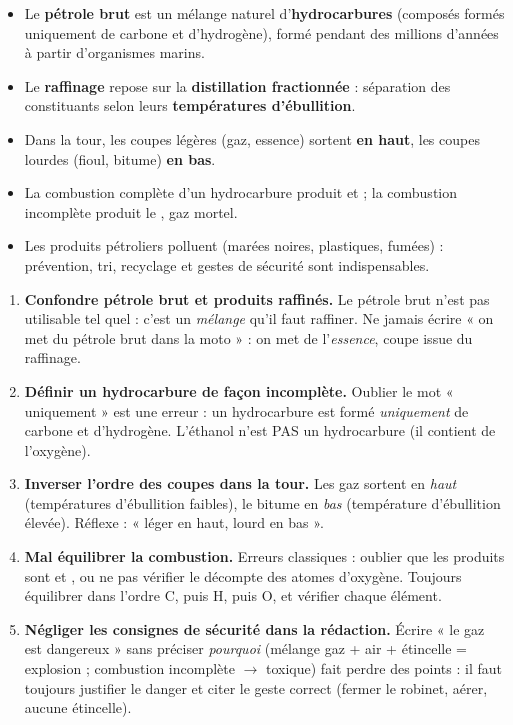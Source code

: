 \documentclass[11pt]{article}
\begin{document}
\begin{aretenir}
\begin{itemize}
\item Le \textbf{pétrole brut} est un mélange naturel d'\textbf{hydrocarbures} (composés formés uniquement de carbone et d'hydrogène), formé pendant des millions d'années à partir d'organismes marins.
\item Le \textbf{raffinage} repose sur la \textbf{distillation fractionnée} : séparation des constituants selon leurs \textbf{températures d'ébullition}.
\item Dans la tour, les coupes légères (gaz, essence) sortent \textbf{en haut}, les coupes lourdes (fioul, bitume) \textbf{en bas}.
\item La combustion complète d'un hydrocarbure produit  et  ; la combustion incomplète produit le , gaz mortel.
\item Les produits pétroliers polluent (marées noires, plastiques, fumées) : prévention, tri, recyclage et gestes de sécurité sont indispensables.
\end{itemize}
\end{aretenir}

\begin{attention}
\begin{enumerate}
\item \textbf{Confondre pétrole brut et produits raffinés.} Le pétrole brut n'est pas utilisable tel quel : c'est un \emph{mélange} qu'il faut raffiner. Ne jamais écrire « on met du pétrole brut dans la moto » : on met de l'\emph{essence}, coupe issue du raffinage.
\item \textbf{Définir un hydrocarbure de façon incomplète.} Oublier le mot « uniquement » est une erreur : un hydrocarbure est formé \emph{uniquement} de carbone et d'hydrogène. L'éthanol  n'est PAS un hydrocarbure (il contient de l'oxygène).
\item \textbf{Inverser l'ordre des coupes dans la tour.} Les gaz sortent en \emph{haut} (températures d'ébullition faibles), le bitume en \emph{bas} (température d'ébullition élevée). Réflexe : « léger en haut, lourd en bas ».
\item \textbf{Mal équilibrer la combustion.} Erreurs classiques : oublier que les produits sont  et , ou ne pas vérifier le décompte des atomes d'oxygène. Toujours équilibrer dans l'ordre C, puis H, puis O, et vérifier chaque élément.
\item \textbf{Négliger les consignes de sécurité dans la rédaction.} Écrire « le gaz est dangereux » sans préciser \emph{pourquoi} (mélange gaz + air + étincelle = explosion ; combustion incomplète $\rightarrow$  toxique) fait perdre des points : il faut toujours justifier le danger et citer le geste correct (fermer le robinet, aérer, aucune étincelle).
\end{enumerate}
\end{attention}
\end{document}
